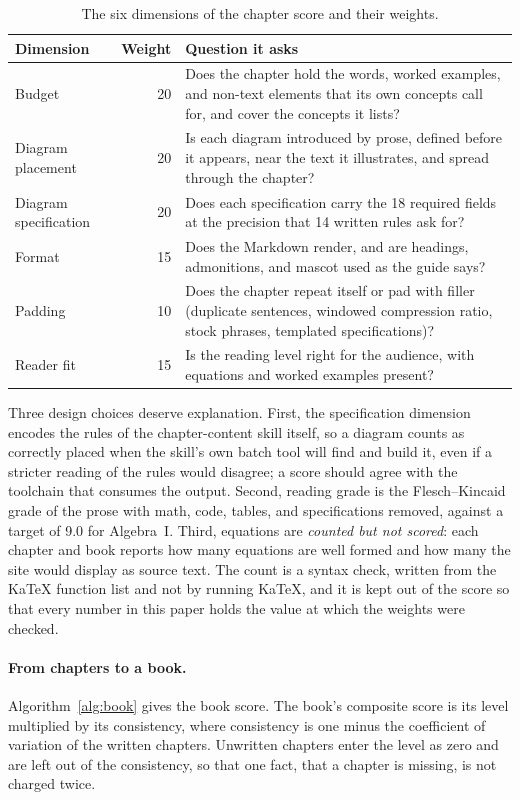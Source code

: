 \documentclass[11pt]{article}
\begin{document}
\begin{table}[htbp]
\centering
\small
\begin{tabularx}{\textwidth}{@{}lrX@{}}
\toprule
\textbf{Dimension} & \textbf{Weight} & \textbf{Question it asks} \\
\midrule
Budget & 20 & Does the chapter hold the words, worked examples, and non-text elements that its own concepts call for, and cover the concepts it lists? \\
Diagram placement & 20 & Is each diagram introduced by prose, defined before it appears, near the text it illustrates, and spread through the chapter? \\
Diagram specification & 20 & Does each specification carry the 18 required fields at the precision that 14 written rules ask for? \\
Format & 15 & Does the Markdown render, and are headings, admonitions, and mascot used as the guide says? \\
Padding & 10 & Does the chapter repeat itself or pad with filler (duplicate sentences, windowed compression ratio, stock phrases, templated specifications)? \\
Reader fit & 15 & Is the reading level right for the audience, with equations and worked examples present? \\
\bottomrule
\end{tabularx}
\caption{The six dimensions of the chapter score and their weights.}
\label{tab:dimensions}
\end{table}

Three design choices deserve explanation. First, the specification dimension encodes the rules of the chapter-content skill itself, so a diagram counts as correctly placed when the skill's own batch tool will find and build it, even if a stricter reading of the rules would disagree; a score should agree with the toolchain that consumes the output. Second, reading grade is the Flesch--Kincaid grade \cite{kincaid1975} of the prose with math, code, tables, and specifications removed, against a target of 9.0 for Algebra~I. Third, equations are \textit{counted but not scored}: each chapter and book reports how many equations are well formed and how many the site would display as source text. The count is a syntax check, written from the KaTeX function list and not by running KaTeX, and it is kept out of the score so that every number in this paper holds the value at which the weights were checked.

\paragraph{From chapters to a book.}
Algorithm~\ref{alg:book} gives the book score. The book's composite score is its level multiplied by its consistency, where consistency is one minus the coefficient of variation of the written chapters. Unwritten chapters enter the level as zero and are left out of the consistency, so that one fact, that a chapter is missing, is not charged twice.
\end{document}
